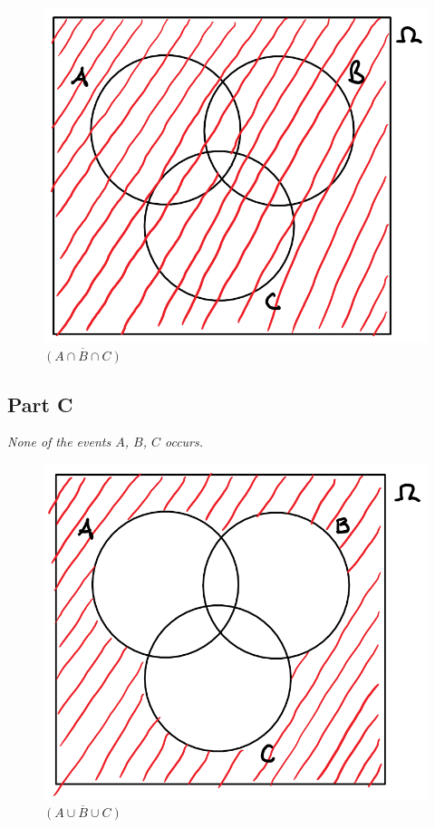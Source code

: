\documentclass{article}
\begin{document}
\begin{figure}[H]
    \centering
    \includegraphics[scale=0.5]{"P1B"}
    \caption{ $ \overline{(A \cap B \cap C)} $ }
\end{figure}

\subsection*{Part C}

\textit{None of the events $ A $, $ B $, $ C $ occurs.}

\begin{figure}[H]
    \centering
    \includegraphics[scale=0.5]{"P1C"}
    \caption{ $ \overline{(A \cup B \cup C)} $ }
\end{figure}
\end{document}
